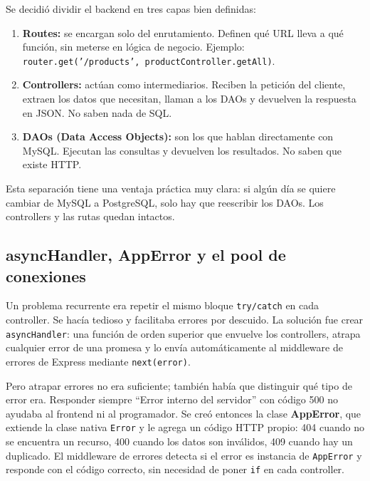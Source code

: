 \documentclass[journal]{IEEEtran}
\begin{document}
	Se decidi\'{o} dividir el backend en tres capas bien definidas:
	
	\begin{enumerate}[leftmargin=*, label=\arabic*., itemsep=2pt]
		\item \textbf{Routes:} se encargan solo del enrutamiento.
		Definen qu\'{e} URL lleva a qu\'{e} funci\'{o}n, sin meterse
		en l\'{o}gica de negocio. Ejemplo:
		\texttt{router.get('/products', productController.getAll)}.
		
		\item \textbf{Controllers:} act\'{u}an como intermediarios.
		Reciben la petici\'{o}n del cliente, extraen los datos que
		necesitan, llaman a los DAOs y devuelven la respuesta en
		JSON. No saben nada de SQL.
		
		\item \textbf{DAOs (Data Access Objects):} son los que hablan
		directamente con MySQL. Ejecutan las consultas y devuelven
		los resultados. No saben que existe HTTP.
	\end{enumerate}
	
	Esta separaci\'{o}n tiene una ventaja pr\'{a}ctica muy clara: si
	alg\'{u}n d\'{i}a se quiere cambiar de MySQL a PostgreSQL, solo
	hay que reescribir los DAOs. Los controllers y las rutas quedan
	intactos.
	
	\subsection{asyncHandler, AppError y el pool de conexiones}
	\label{subsec:middleware}
	
	Un problema recurrente era repetir el mismo bloque
	\texttt{try/catch} en cada controller. Se hac\'{i}a tedioso y
	facilitaba errores por descuido. La soluci\'{o}n fue crear
	\texttt{asyncHandler}: una funci\'{o}n de orden superior que
	envuelve los controllers, atrapa cualquier error de una promesa y
	lo env\'{i}a autom\'{a}ticamente al middleware de errores de
	Express mediante \texttt{next(error)}.
	
	Pero atrapar errores no era suficiente; tambi\'{e}n hab\'{i}a que
	distinguir qu\'{e} tipo de error era. Responder siempre ``Error
	interno del servidor'' con c\'{o}digo 500 no ayudaba al frontend
	ni al programador. Se cre\'{o} entonces la clase
	\textbf{AppError}, que extiende la clase nativa \texttt{Error} y
	le agrega un c\'{o}digo HTTP propio: 404 cuando no se encuentra
	un recurso, 400 cuando los datos son inv\'{a}lidos, 409 cuando
	hay un duplicado. El middleware de errores detecta si el error es
	instancia de \texttt{AppError} y responde con el c\'{o}digo
	correcto, sin necesidad de poner \texttt{if} en cada controller.
	
\end{document}
